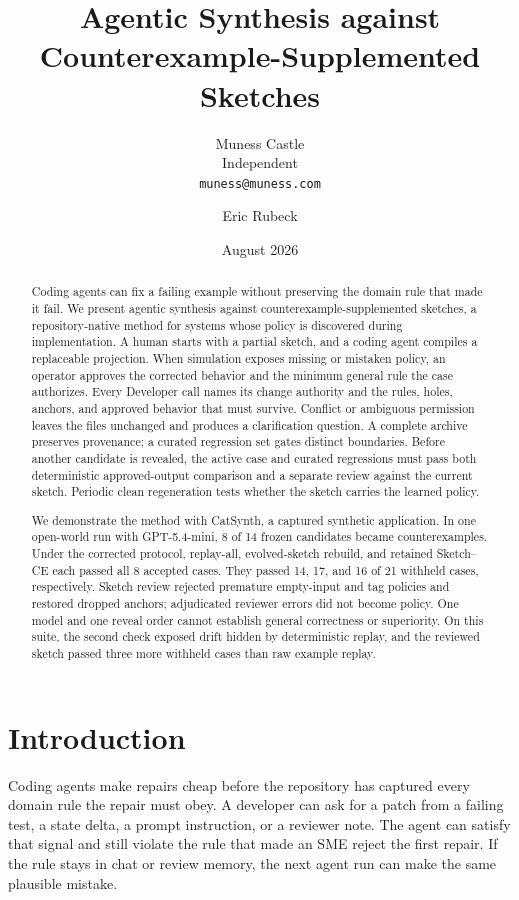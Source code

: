 \documentclass[11pt]{article}
\title{Agentic Synthesis against Counterexample-Supplemented Sketches}
\author{Muness Castle\\{\small Independent}\\{\small\texttt{muness@muness.com}} \and Eric Rubeck}
\date{August 2026}
\begin{document}
\maketitle
\paperlicense

\begin{abstract}
Coding agents can fix a failing example without preserving the domain rule that made it fail.
We present agentic synthesis against counterexample-supplemented sketches, a repository-native
method for systems whose policy is discovered during implementation.  A human starts with a
partial sketch, and a coding agent compiles a replaceable projection.  When simulation exposes
missing or mistaken policy, an operator approves the corrected behavior and the minimum general
rule the case authorizes.  Every Developer call names its change authority and the rules, holes,
anchors, and approved behavior that must survive.  Conflict or ambiguous permission leaves the
files unchanged and produces a clarification question.  A complete archive preserves provenance;
a curated regression set gates distinct
boundaries.  Before another candidate is revealed, the active case and curated regressions must
pass both deterministic approved-output comparison and a separate review against the current
sketch.  Periodic clean regeneration tests whether the sketch carries the learned policy.

We demonstrate the method with CatSynth, a captured synthetic application.  In one open-world run
with GPT-5.4-mini, 8 of 14 frozen candidates
became counterexamples.  Under the corrected protocol, replay-all, evolved-sketch rebuild, and
retained Sketch--CE each passed all 8 accepted cases.  They passed 14, 17, and 16 of 21 withheld
cases, respectively.  Sketch review rejected premature empty-input and tag policies and restored
dropped anchors; adjudicated reviewer errors did not become policy.  One model and one reveal
order cannot establish general correctness or superiority.  On this suite, the second check
exposed drift hidden by deterministic replay, and the reviewed sketch passed three more withheld
cases than raw example replay.
\end{abstract}

\section{Introduction}
\label{sec:introduction}

Coding agents make repairs cheap before the repository has captured every domain rule the
repair must obey.  A developer can ask for a patch from a failing test, a state delta, a prompt
instruction, or a reviewer note.  The agent can satisfy that signal and still violate the rule
that made an SME reject the first repair.  If the rule stays in chat or review memory, the next
agent run can make the same plausible mistake.
\end{document}
